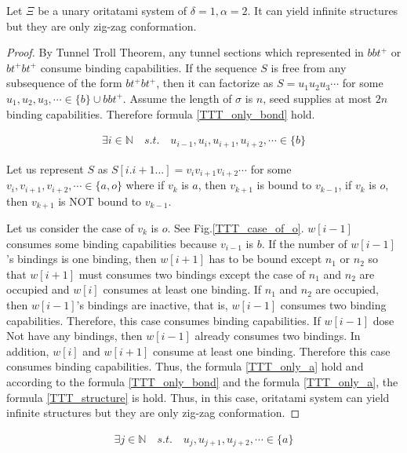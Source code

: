 \begin{theorem}[$\delta= 1, \alpha=2$]
Let $\Xi$ be a unary oritatami system of $\delta = 1, \alpha = 2$. It can yield infinite structures but they are only zig-zag conformation.
\end{theorem}

\begin{proof}
By Tunnel Troll Theorem, any tunnel sections which represented in $bbt^+$ or $bt^+bt^+$ consume binding capabilities. If the sequence $S$ is free from any subsequence of the form $bt^+bt^+$, then it can factorize as $S = u_1 u_2 u_3 \cdots$ for some $u_1 , u_2 , u_3 , \cdots \in \{b\} \cup bbt^+$. Assume the length of $\sigma$ is $n$, seed supplies at most $2n$ binding capabilities. Therefore formula \ref{TTT_only_bond} hold.

\begin{eqnarray}
  \exists i \in \mathbb{N} \quad s.t. \quad u_{i-1} , u_i , u_{i+1} , u_{i+2} , \cdots \in \{ b \}
  \label{TTT_only_bond}
\end{eqnarray}


Let us represent $S$ as $S[i.i+1...] = v_i v_{i+1} v_{i+2} \cdots$ for some $v_i, v_{i+1}, v_{i+2}, \cdots \in \{ a, o\}$ where if $v_k$ is $a$, then $v_{k+1}$ is bound to $v_{k-1}$, if $v_k$ is $o$, then $v_{k+1}$ is NOT bound to $v_{k-1}$.


Let us consider the case of $v_k$ is $o$. See Fig.\ref{TTT_case_of_o}. $w[i-1]$ consumes some binding capabilities because $v_{i-1}$ is $b$. If the number of $w[i-1]$'s bindings is one binding, then $w[i+1]$ has to be bound except $n_1$ or $n_2$ so that $w[i+1]$ must consumes two bindings except the case of $n_1$ and $n_2$ are occupied and $w[i]$ consumes at least one binding. If $n_1$ and $n_2$ are occupied, then $w[i-1]$'s bindings are inactive, that is, $w[i-1]$ consumes two binding capabilities. Therefore, this case consumes binding capabilities. If $w[i-1]$ dose Not have any bindings, then $w[i-1]$ already consumes two bindings. In addition, $w[i]$ and $w[i+1]$ consume at least one binding. Therefore this case consumes binding capabilities. Thus, the formula \ref{TTT_only_a} hold and according to the formula \ref{TTT_only_bond} and the formula \ref{TTT_only_a}, the formula \ref{TTT_structure} is hold. Thus, in this case, oritatami system can yield infinite structures but they are only zig-zag conformation.

\end{proof}

\begin{eqnarray}
  \exists j \in \mathbb{N} \quad s.t. \quad u_j , u_{j+1} , u_{j+2} , \cdots \in \{ a \}
  \label{TTT_only_a}
\end{eqnarray}


